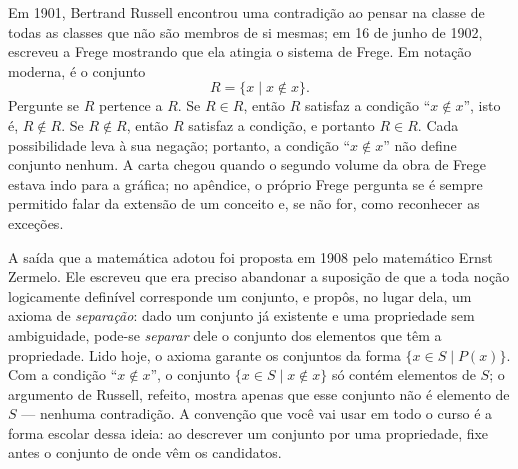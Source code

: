 Em 1901, Bertrand Russell encontrou uma contradição ao pensar na classe de todas as classes que não são membros de si mesmas; em 16 de junho de 1902, escreveu a Frege mostrando que ela atingia o sistema de Frege. Em notação moderna, é o conjunto
\[
R=\{x\mid x\notin x\}.
\]
Pergunte se $R$ pertence a $R$. Se $R\in R$, então $R$ satisfaz a condição \enquote{$x\notin x$}, isto é, $R\notin R$. Se $R\notin R$, então $R$ satisfaz a condição, e portanto $R\in R$. Cada possibilidade leva à sua negação; portanto, a condição \enquote{$x\notin x$} não define conjunto nenhum. A carta chegou quando o segundo volume da obra de Frege estava indo para a gráfica; no apêndice, o próprio Frege pergunta se é sempre permitido falar da extensão de um conceito e, se não for, como reconhecer as exceções.

A saída que a matemática adotou foi proposta em 1908 pelo matemático Ernst Zermelo. Ele escreveu que era preciso abandonar a suposição de que a toda noção logicamente definível corresponde um conjunto, e propôs, no lugar dela, um axioma de \emph{separação}: dado um conjunto já existente e uma propriedade sem ambiguidade, pode-se \emph{separar} dele o conjunto dos elementos que têm a propriedade. Lido hoje, o axioma garante os conjuntos da forma $\{x\in S\mid P(x)\}$. Com a condição \enquote{$x\notin x$}, o conjunto $\{x\in S\mid x\notin x\}$ só contém elementos de $S$; o argumento de Russell, refeito, mostra apenas que esse conjunto não é elemento de $S$ — nenhuma contradição. A convenção que você vai usar em todo o curso é a forma escolar dessa ideia: ao descrever um conjunto por uma propriedade, fixe antes o conjunto de onde vêm os candidatos.

